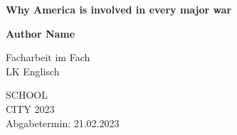 \begin{center}
	{
		\vspace*{1cm}
		
		\Huge
		\textbf{Why America is involved in every major war}
		
		\vspace{2cm}
		
		\textbf{Author Name}
		
		\vspace{1.5cm}
		
		Facharbeit im Fach\\
		LK Englisch
		
		\vfill
		\Large
		SCHOOL\\
		CITY 2023\\
		Abgabetermin: 21.02.2023
	}
\end{center}